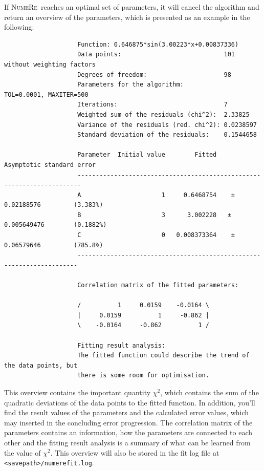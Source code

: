 \documentclass[DIV=14,headsepline,footsepline]{scrbook}
\newcommand{\NR}{\textsc{Nu\-me\-Re}}
\begin{document}
				If \NR\ reaches an optimal set of parameters, it will cancel the algorithm and return an overview of the parameters, which is presented as an example in the following:
				\begin{verbatim}
					Function: 0.646875*sin(3.00223*x+0.00837336)
					Data points:                            101 without weighting factors
					Degrees of freedom:                     98
					Parameters for the algorithm:           TOL=0.0001, MAXITER=500
					Iterations:                             7
					Weighted sum of the residuals (chi^2):  2.33825
					Variance of the residuals (red. chi^2): 0.0238597
					Standard deviation of the residuals:    0.1544658

					Parameter  Initial value        Fitted        Asymptotic standard error
					-----------------------------------------------------------------------
					A                      1     0.6468754    ± 0.02188576         (3.383%)
					B                      3      3.002228   ± 0.005649476        (0.1882%)
					C                      0   0.008373364    ± 0.06579646         (785.8%)
					----------------------------------------------------------------------

					Correlation matrix of the fitted parameters:

					/          1     0.0159    -0.0164 \
					|     0.0159          1     -0.862 |
					\    -0.0164     -0.862          1 /

					Fitting result analysis:
					The fitted function could describe the trend of the data points, but 
					there is some room for optimisation.
				\end{verbatim}
				This overview contains the important quantity $\chi^2$, which contains the sum of the quadratic deviations of the data points to the fitted function. In addition, you'll find the result values of the parameters and the calculated error values, which may inserted in the concluding error progression. The correlation matrix of the parameters contains an information, how the parameters are connected to each other and the fitting result analysis is a summary of what can be learned from the value of $\chi^2$. This overview will also be stored in the fit log file at \verb+<savepath>/numerefit.log+.
\end{document}
